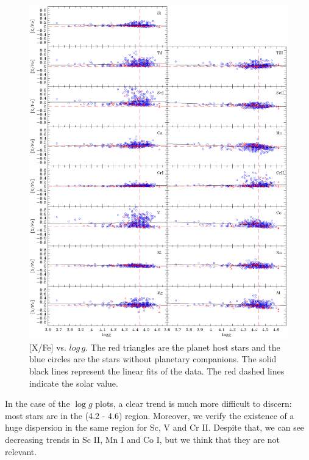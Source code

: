 \documentclass[dvips,12pt,a4paper]{report}
\begin{document}
{{\begin{figure}[h!]
\centering
\includegraphics[trim=0cm 1.5cm 0cm 1cm,clip,width=16 cm]{pics/parte3/xfelogg.eps}
\caption[depois]{[X/Fe] vs. $log\,g$. The red triangles are the planet host stars and the blue circles are the stars without planetary companions. The solid black lines represent the linear fits of the data. The red dashed lines indicate the solar value.}
\label{xfelogg}
\end{figure}

In the case of the $\log g$ plots, a clear trend is much more difficult to discern: most stars are in the (4.2 - 4.6) region. Moreover, we verify the existence of a huge dispersion in the same region for Sc, V and Cr II. Despite that, we can see decreasing trends in Sc II, Mn I and Co I, but we think that they are not relevant. 


}}
\end{document}

